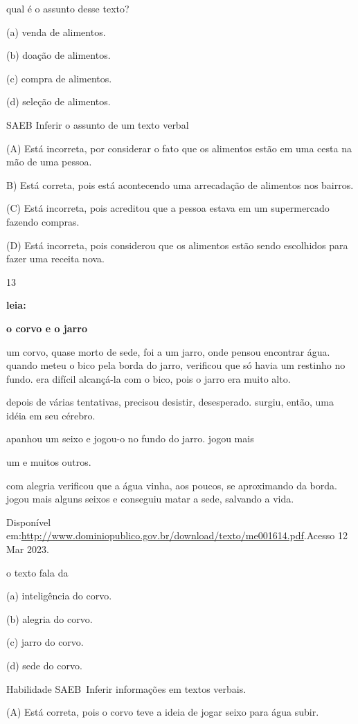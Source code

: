 {{{{{{qual é o assunto desse texto?

(a) venda de alimentos.

(b) doação de alimentos.

(c) compra de alimentos.

(d) seleção de alimentos.

SAEB Inferir o assunto de um texto verbal

(A) Está incorreta, por considerar o fato que os alimentos estão em uma
cesta na mão de uma pessoa.

B) Está correta, pois está acontecendo uma arrecadação de alimentos nos
bairros.

(C) Está incorreta, pois acreditou que a pessoa estava em um
supermercado fazendo compras.

(D) Está incorreta, pois considerou que os alimentos estão sendo
escolhidos para fazer uma receita nova.

\num{13}

\textbf{leia:}

\textbf{o corvo e o jarro}

um corvo, quase morto de sede, foi a um jarro, onde pensou encontrar
água. quando meteu o bico pela borda do jarro, verificou que só havia um
restinho no fundo. era difícil alcançá-la com o bico, pois o jarro era
muito alto.

depois de várias tentativas, precisou desistir, desesperado. surgiu,
então, uma idéia em seu cérebro.

apanhou um seixo e jogou-o no fundo do jarro. jogou mais

um e muitos outros.

com alegria verificou que a água vinha, aos poucos, se aproximando da
borda. jogou mais alguns seixos e conseguiu matar a sede, salvando a
vida.

Disponível
em:\url{http://www.dominiopublico.gov.br/download/texto/me001614.pdf}.Acesso
12 Mar 2023.

o texto fala da

(a) inteligência do corvo.

(b) alegria do corvo.

(c) jarro do corvo.

(d) sede do corvo.

Habilidade SAEB~Inferir informações em textos verbais.

\protect\hypertarget{_Hlk129586281}{}{}(\protect\hypertarget{_Hlk129420306}{}{}A)
Está correta, pois o corvo teve a ideia de jogar seixo para água subir.

}}}}}}
